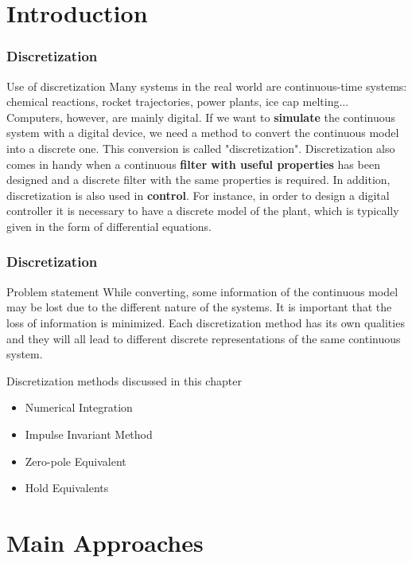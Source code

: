 \section{Introduction}

\begin{frame}
	\frametitle{Discretization}
	\begin{block}{Use of discretization}
		Many systems in the real world are continuous-time systems: chemical reactions, rocket trajectories, power plants, ice cap melting... Computers, however, are mainly digital. If we want to \textbf{simulate} the continuous system with a digital device, we need a method to convert the continuous model into a discrete one.  This conversion is called "discretization". Discretization also comes in handy when a continuous \textbf{filter with useful properties} has been designed and a discrete filter with the same properties is required. In addition, discretization is also used in \textbf{control}. For instance, in order to design a digital controller it is necessary to have a discrete model of the plant, which is typically given in the form of differential equations.
	\end{block}
\end{frame}

\begin{frame}
	\frametitle{Discretization}
	\begin{block}{Problem statement}
		While converting, some information of the continuous model may be lost due to the different nature of the systems. It is important that the loss of information is minimized. Each discretization method has its own qualities and they will all lead to different discrete representations of the same continuous system.
	\end{block}
	
	\begin{block}{Discretization methods discussed in this chapter}
		\begin{itemize}
			\item Numerical Integration
			\item Impulse Invariant Method
			\item Zero-pole Equivalent
			\item Hold Equivalents
		\end{itemize}
	\end{block}
\end{frame}

\section{Main Approaches}
